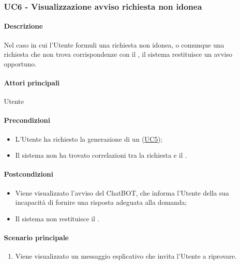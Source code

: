 \subsubsection{UC6 - Visualizzazione avviso richiesta non idonea}\label{UC6}
\paragraph*{Descrizione}
Nel caso in cui l'Utente formuli una richiesta non idonea, o comunque una richiesta che non trova corrispondenze con il , il sistema restituisce un avviso opportuno.

\paragraph*{Attori principali}
Utente

\paragraph*{Precondizioni}
\begin{itemize}
  \item L'Utente ha richiesto la generazione di un  (\hyperref[UC5]{UC5});
  \item Il sistema non ha trovato correlazioni tra la richiesta e il .
\end{itemize}

\paragraph*{Postcondizioni}
\begin{itemize}
  \item Viene visualizzato l'avviso del ChatBOT, che informa l'Utente della sua incapacità di fornire una risposta adeguata alla domanda;
  \item Il sistema non restituisce il .
\end{itemize}

\paragraph*{Scenario principale}
\begin{enumerate}
  \item Viene visualizzato un messaggio esplicativo che invita l'Utente a riprovare.
\end{enumerate}